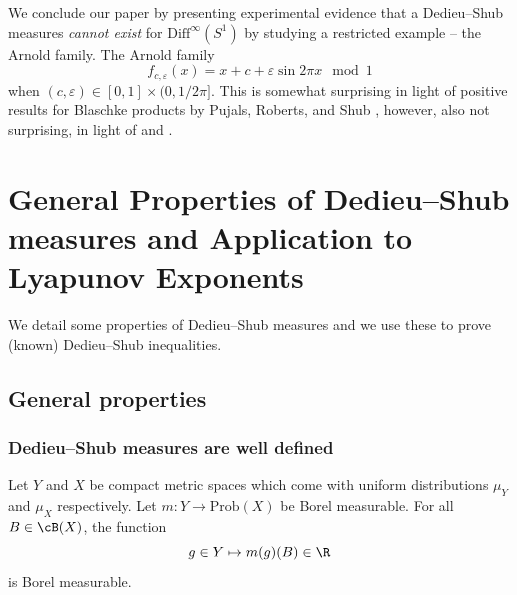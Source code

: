 \documentclass[10pt]{amsart}
\numberwithin{equation}{section}     %
\begin{document}
We conclude our paper by presenting experimental evidence that a Dedieu--Shub measures \textit{cannot exist} for $\text{Diff}^\infty(S^1)$ by studying a restricted example -- the Arnold family. The Arnold family $$f_{c,\varepsilon}(x) = x + c + \varepsilon \sin 2 \pi x \mod 1$$ when $(c,\varepsilon) \in [0,1] \times (0,1/2\pi].$ This is somewhat surprising in light of positive results for Blaschke products by Pujals, Roberts, and Shub \cite{pujals2006expanding}, however, also not surprising, in light of \cite{dLL2008entropy} and \cite{ledrappier2003random}. 





\section{General Properties of Dedieu--Shub measures and Application to Lyapunov Exponents}

We detail some properties of Dedieu--Shub measures and we use these to prove (known) Dedieu--Shub inequalities. 

\subsection{General properties}
\subsubsection{Dedieu--Shub measures are well defined}

\begin{lemma}
Let $Y$ and $X$ be compact metric spaces which come with uniform distributions $\mu_Y$ and $\mu_X$ respectively. Let $m: Y \to \text{Prob}(X)$ be Borel measurable. For all $B \in \cB(X)$, the function $$g \in Y \mapsto m(g)(B) \in \R$$ is Borel measurable.
\end{lemma}
\end{document}
